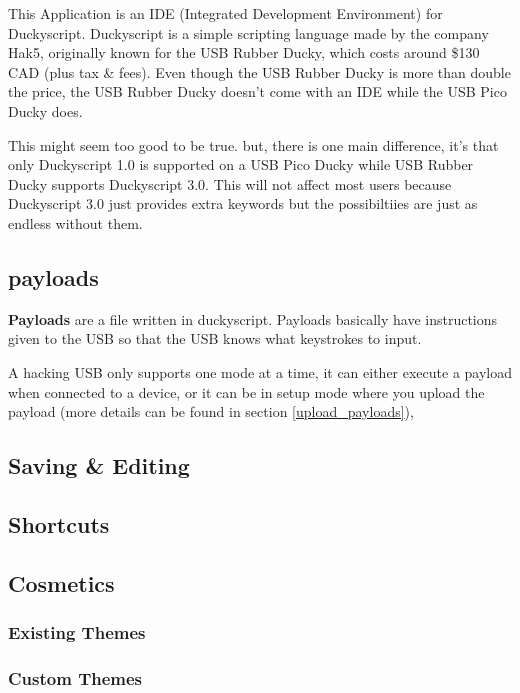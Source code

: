 \documentclass[a4paper,12pt]{article}
\begin{document}
This Application is an IDE (Integrated Development Environment) for Duckyscript. Duckyscript is a simple scripting language made by the company Hak5, originally known for the USB Rubber Ducky, which costs around \$130 CAD (plus tax \& fees).
Even though the USB Rubber Ducky is more than double the price, the USB Rubber Ducky doesn't come with an IDE while the USB Pico Ducky does.

This might seem too good to be true. but, there is one main difference,
it's that only Duckyscript 1.0 is supported on a USB Pico Ducky while USB Rubber Ducky supports Duckyscript 3.0. This will not affect most users because Duckyscript 3.0 just provides extra keywords but the possibiltiies are just as endless without them.

\subsection{payloads}

\textbf{Payloads} are a file written in duckyscript. Payloads basically have instructions given to the USB so that the USB knows what keystrokes to input.

A hacking USB only supports one mode at a time, it can either execute a payload when connected to a device, or it can be in setup mode where you upload the payload (more details can be found in section \ref{upload_payloads}), 

\subsection{Saving \& Editing}

\subsection{Shortcuts}

\subsection{Cosmetics}

\subsubsection{Existing Themes}

\subsubsection{Custom Themes}
\end{document}
